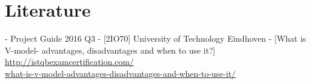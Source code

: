 \section{Literature}
- Project Guide 2016 Q3 - [2IO70] University of Technology Eindhoven
\newline \noindent -  [What is V-model- advantages, disadvantages and when to use it?] \href{http://istqbexamcertification.com/what-is-v-model-advantages-disadvantages-and-when-to-use-it/}{http://istqbexamcertification.com/\\what-is-v-model-advantages-disadvantages-and-when-to-use-it/}
